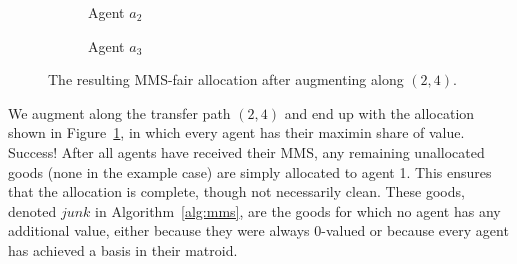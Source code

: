 \begin{figure}[ht!]
\begin{subfigure}{0.3\textwidth}
      \caption{Agent $a_2$}
    \end{subfigure}
    \hfill
    \begin{subfigure}{0.3\textwidth}
      \centering
      \caption{Agent $a_3$}
    \end{subfigure}

    \caption{The resulting MMS-fair allocation after augmenting along $(2,4)$.}
    \label{fig:yes_mms}
  \end{figure}

We augment along the transfer path $(2,4)$ and end up with the allocation shown in Figure~\ref{fig:yes_mms}, in which every agent has their maximin share of value. Success! After all agents have received their MMS, any remaining unallocated goods (none in the example case) are simply allocated to agent 1. This ensures that the allocation is complete, though not necessarily clean. These goods, denoted $junk$ in Algorithm~\ref{alg:mms}, are the goods for which no agent has any additional value, either because they were always 0-valued or because every agent has achieved a basis in their matroid.

